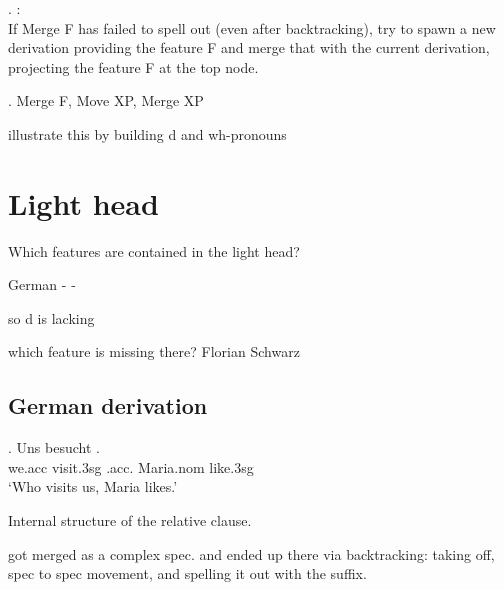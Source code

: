 \ex.  \citep{starke2018}:\\
If Merge F has failed to spell out (even after backtracking), try to spawn a new derivation providing the feature F and merge that with the current derivation, projecting the feature F at the top node.\label{ex:specformation}

\ex. Merge F, Move XP, Merge XP


illustrate this by building d and wh-pronouns




\section{Light head}

Which features are contained in the light head?

German  - 
 - 

so d is lacking

which feature is missing there? Florian Schwarz




\subsection{German derivation}



\exg. Uns besucht   .\\
 we.\ac{acc} visit.3\ac{sg}\scsub{[nom]} .\ac{acc}. Maria.\ac{nom} like.3\ac{sg}\scsub{[acc]}\\
 `Who visits us, Maria likes.' 

Internal structure of the relative clause.

 got merged as a complex spec.  and  ended up there via backtracking: taking  off, spec to spec movement, and spelling it out with the suffix.

